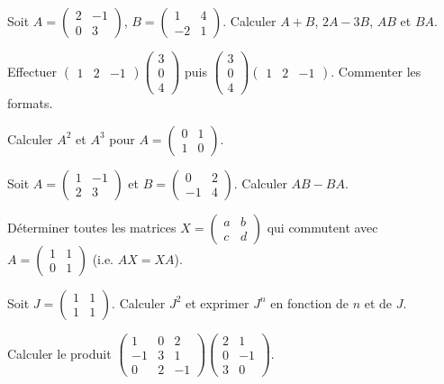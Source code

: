 \exo{} Soit $A=\begin{pmatrix}2&-1\\0&3\end{pmatrix}$, $B=\begin{pmatrix}1&4\\-2&1\end{pmatrix}$.
Calculer $A+B$, $2A-3B$, $AB$ et $BA$.

\exo{} Effectuer $\begin{pmatrix}1&2&-1\end{pmatrix}\begin{pmatrix}3\\0\\4\end{pmatrix}$ puis
$\begin{pmatrix}3\\0\\4\end{pmatrix}\begin{pmatrix}1&2&-1\end{pmatrix}$. Commenter les formats.

\exo{} Calculer $A^2$ et $A^3$ pour $A=\begin{pmatrix}0&1\\1&0\end{pmatrix}$.

\exo{} Soit $A=\begin{pmatrix}1&-1\\2&3\end{pmatrix}$ et $B=\begin{pmatrix}0&2\\-1&4\end{pmatrix}$.
Calculer $AB-BA$.

\exo{} Déterminer toutes les matrices $X=\begin{pmatrix}a&b\\c&d\end{pmatrix}$ qui commutent
avec $A=\begin{pmatrix}1&1\\0&1\end{pmatrix}$ (i.e. $AX=XA$).

\exo{} Soit $J=\begin{pmatrix}1&1\\1&1\end{pmatrix}$. Calculer $J^2$ et exprimer $J^n$ en
fonction de $n$ et de $J$.

\exo{} Calculer le produit
$\begin{pmatrix}1&0&2\\-1&3&1\\0&2&-1\end{pmatrix}\begin{pmatrix}2&1\\0&-1\\3&0\end{pmatrix}$.


